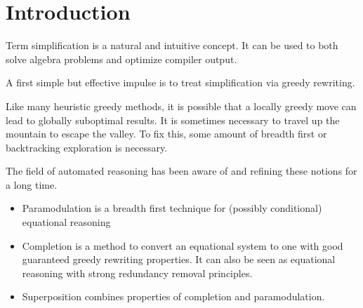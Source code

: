 \documentclass[sigplan,10pt,review,anonymous]{acmart}
\begin{document}




\maketitle


\section{Introduction}

Term simplification is a natural and intuitive concept. It can be used to both solve algebra problems and optimize compiler output. 

A first simple but effective impulse is to treat simplification via greedy rewriting.

Like many heuristic greedy methods, it is possible that a locally greedy move can lead to globally suboptimal results. It is sometimes necessary to travel up the mountain to escape the valley. To fix this, some amount of breadth first or backtracking exploration is necessary.

The field of automated reasoning has been aware of and refining these notions for a long time.

\begin{itemize}

\item Paramodulation \cite{NIEUWENHUIS2001371} is a breadth first technique for (possibly conditional) equational reasoning
\item Completion\cite{traatbook} is a method to convert an equational system to one with good guaranteed greedy rewriting properties. It can also be seen as equational reasoning with strong redundancy removal principles.
\item Superposition \cite{braniac} combines properties of completion and paramodulation.

\end{itemize}
\end{document}
